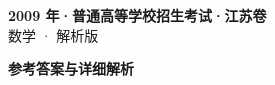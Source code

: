 \documentclass[zihao=-4, a4paper]{ctexart}
\begin{document}
\begin{center}
  {\Large\bfseries 2009 年·普通高等学校招生考试·江苏卷}\\[4pt]
  {\large 数学 · 解析版}
\end{center}
\medskip
{}

\clearpage
{}
\begin{center}{\Large\bfseries 参考答案与详细解析}\end{center}
\medskip

\end{document}
